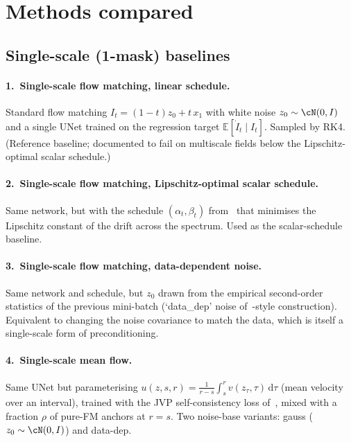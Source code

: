 \documentclass[11pt]{article}
\begin{document}
\section{Methods compared}
\label{sec:methods}

\subsection{Single-scale (1-mask) baselines}
\paragraph{1.\ Single-scale flow matching, linear schedule.}
Standard flow matching $I_t = (1-t)z_0 + t\,x_1$ with white noise $z_0\sim\cN(0,I)$ and a single UNet trained on the regression target $\mathbb{E}[\dot I_t \mid I_t]$. Sampled by RK4. (Reference baseline; documented to fail on multiscale fields below the Lipschitz-optimal scalar schedule.)

\paragraph{2.\ Single-scale flow matching, Lipschitz-optimal scalar schedule.}
Same network, but with the schedule $(\alpha_t,\beta_t)$ from~\cite{chen2025scale} that minimises the Lipschitz constant of the drift across the spectrum. Used as the scalar-schedule baseline.

\paragraph{3.\ Single-scale flow matching, data-dependent noise.}
Same network and schedule, but $z_0$ drawn from the empirical second-order statistics of the previous mini-batch (`data\_dep' noise of~\cite{chen2025affine}-style construction). Equivalent to changing the noise covariance to match the data, which is itself a single-scale form of preconditioning.

\paragraph{4.\ Single-scale mean flow.}
Same UNet but parameterising $u(z,s,r) = \tfrac{1}{r-s}\int_s^r v(z_\tau,\tau)\,\mathrm{d}\tau$ (mean velocity over an interval), trained with the JVP self-consistency loss of~\cite{geng2024meanflow}, mixed with a fraction $\rho$ of pure-FM anchors at $r=s$. Two noise-base variants: gauss ($z_0\sim\cN(0,I)$) and data-dep.
\end{document}
